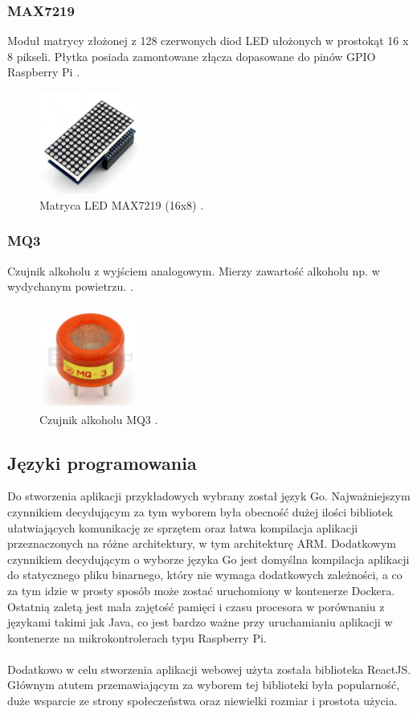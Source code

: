 \documentclass[12pt]{report}
\let\Oldsubsection\subsection
\renewcommand{\subsection}{\FloatBarrier\Oldsubsection}
\let\Oldsubsubsection\subsubsection
\renewcommand{\subsubsection}{\FloatBarrier\Oldsubsubsection}
\begin{document}
{\subsubsection{MAX7219}
Moduł matrycy złożonej z 128 czerwonych diod LED ułożonych w prostokąt 16 x 8 pikseli. Płytka posiada zamontowane złącza dopasowane do pinów GPIO Raspberry Pi \cite{max7219Botland}. %
\begin{figure}[h]
	\centering
	\includegraphics[width=0.3\textwidth]{images/max7219.jpg}
	\caption{Matryca LED MAX7219 (16x8) \cite{max7219Img}.}
\end{figure}
\subsubsection{MQ3}
Czujnik alkoholu z wyjściem analogowym. Mierzy zawartość alkoholu np. w wydychanym powietrzu. \cite{mq3Botland}. %
\begin{figure}[h]
	\centering
	\includegraphics[width=0.3\textwidth]{images/mq3.jpg}
	\caption{Czujnik alkoholu MQ3 \cite{mq3Img}.}
\end{figure}
\subsection{Języki programowania}
Do stworzenia aplikacji przykładowych wybrany został język Go. Najważniejszym czynnikiem decydującym za tym wyborem była obecność dużej ilości bibliotek ułatwiających komunikację ze sprzętem oraz łatwa kompilacja aplikacji przeznaczonych na różne architektury, w tym architekturę ARM. Dodatkowym czynnikiem decydującym o wyborze języka Go jest domyślna kompilacja aplikacji do statycznego pliku binarnego, który nie wymaga dodatkowych zależności, a co za tym idzie w prosty sposób może zostać uruchomiony w kontenerze Dockera. Ostatnią zaletą jest mała zajętość pamięci i czasu procesora w porównaniu z językami takimi jak Java, co jest bardzo ważne przy uruchamianiu aplikacji w kontenerze na mikrokontrolerach typu Raspberry Pi.\\ \\
Dodatkowo w celu stworzenia aplikacji webowej użyta została biblioteka ReactJS. Głównym atutem przemawiającym za wyborem tej biblioteki była popularność, duże wsparcie ze strony społeczeństwa oraz niewielki rozmiar i prostota użycia.

}
\end{document}
